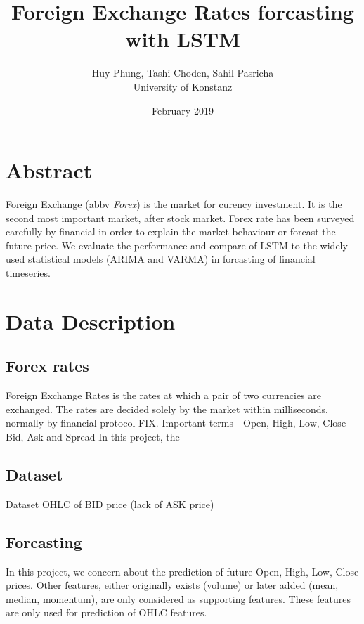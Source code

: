 \documentclass[12pt]{article}
\title{Foreign Exchange Rates forcasting with LSTM}
\author{Huy Phung, Tashi Choden, Sahil Pasricha
  \\University of Konstanz}
\date{February 2019}
\begin{document}
\maketitle
\pagebreak
\tableofcontents
\pagebreak

\section{Abstract}
Foreign Exchange (abbv \textit{Forex}) is the market for curency investment. It
is the second most important market, after stock market. Forex rate has been
surveyed carefully by financial in order to explain the market behaviour or
forcast the future price. We evaluate the performance and compare of LSTM to the
widely used statistical models (ARIMA and VARMA) in forcasting of financial
timeseries. \\


\section{Data Description}
\subsection{Forex rates}
Foreign Exchange Rates is the rates at which a pair of two currencies are
exchanged. The rates are decided solely by the market within milliseconds,
normally by financial 
protocol FIX. 
Important terms
- Open, High, Low, Close
- Bid, Ask and Spread
In this project, the

\subsection{Dataset}
Dataset OHLC of BID price (lack of ASK price)


\subsection{Forcasting}
In this project, we concern about the prediction of future Open, High, Low,
Close prices. Other features, either originally exists (volume) or later added
(mean, median, momentum), are only considered as supporting features. These
features are only used for prediction of OHLC features.
\end{document}

